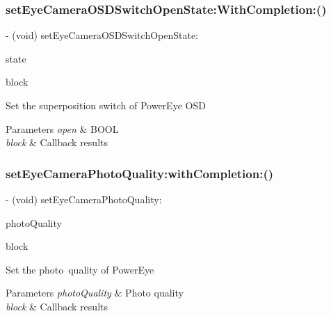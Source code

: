\subsubsection{\texorpdfstring{set\+Eye\+Camera\+O\+S\+D\+Switch\+Open\+State\+:\+With\+Completion\+:()}{setEyeCameraOSDSwitchOpenState:WithCompletion:()}}
{\footnotesize\ttfamily -\/ (void) set\+Eye\+Camera\+O\+S\+D\+Switch\+Open\+State\+: \begin{DoxyParamCaption}\item[{(P\+V\+Eye\+O\+S\+D\+Switch\+State)}]{state }\item[{WithCompletion:(P\+V\+Completion\+Block)}]{block }\end{DoxyParamCaption}}

Set the superposition switch of Power\+Eye O\+SD


\begin{DoxyParams}{Parameters}
{\em open} & B\+O\+OL \\
\hline
{\em block} & Callback results \\
\hline
\end{DoxyParams}
\mbox{\label{interface_p_v_eye_camera_a7e108d05b80c70a0f54c5cc8dd093c76}} 
\subsubsection{\texorpdfstring{set\+Eye\+Camera\+Photo\+Quality\+:with\+Completion\+:()}{setEyeCameraPhotoQuality:withCompletion:()}}
{\footnotesize\ttfamily -\/ (void) set\+Eye\+Camera\+Photo\+Quality\+: \begin{DoxyParamCaption}\item[{(P\+V\+Eye\+Camera\+Photo\+Quality)}]{photo\+Quality }\item[{withCompletion:(P\+V\+Completion\+Block)}]{block }\end{DoxyParamCaption}}

Set the photo quality of Power\+Eye


\begin{DoxyParams}{Parameters}
{\em photo\+Quality} & Photo quality \\
\hline
{\em block} & Callback results \\
\hline
\end{DoxyParams}
\mbox{\label{interface_p_v_eye_camera_adca1950dd337adc4d7fb64f2faf66c94}} 
